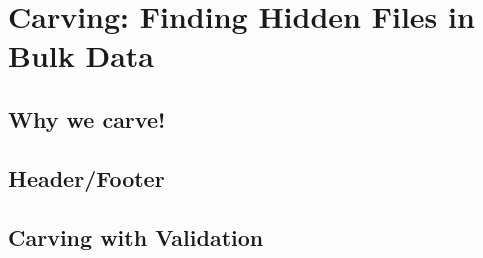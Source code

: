 \chapter{Carving: Finding Hidden Files in Bulk Data}
\section{Why we carve!}
\section{Header/Footer}
\section{Carving with Validation}
